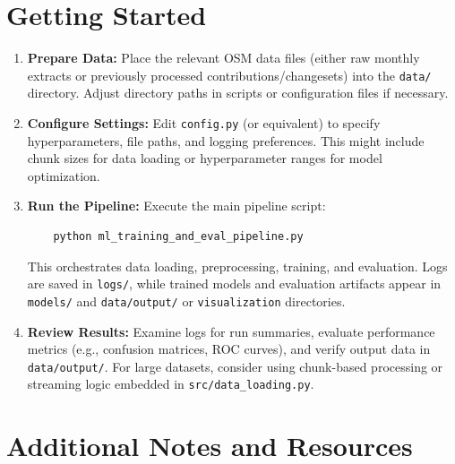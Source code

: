 \documentclass[
    13pt, %
    a4paper, %
    listof=totoc, %
    bibliography=totoc, %
    index=totoc, %
    headsepline
]{scrreprt}
\begin{document}
\section{Getting Started}
\label{sec:getting_started}

\begin{enumerate}
    \item \textbf{Prepare Data:} 
    Place the relevant OSM data files (either raw monthly extracts or previously processed contributions/changesets) into the \texttt{data/} directory. Adjust directory paths in scripts or configuration files if necessary.

    \item \textbf{Configure Settings:}
    Edit \texttt{config.py} (or equivalent) to specify hyperparameters, file paths, and logging preferences. This might include chunk sizes for data loading or hyperparameter ranges for model optimization.

    \item \textbf{Run the Pipeline:} 
    Execute the main pipeline script:
    \begin{verbatim}
    python ml_training_and_eval_pipeline.py
    \end{verbatim}
    This orchestrates data loading, preprocessing, training, and evaluation. Logs are saved in \texttt{logs/}, while trained models and evaluation artifacts appear in \texttt{models/} and \texttt{data/output/} or \texttt{visualization} directories.

    \item \textbf{Review Results:} 
    Examine logs for run summaries, evaluate performance metrics (e.g., confusion matrices, ROC curves), and verify output data in \texttt{data/output/}. For large datasets, consider using chunk-based processing or streaming logic embedded in \texttt{src/data\_loading.py}.
\end{enumerate}

\section{Additional Notes and Resources}
\label{sec:extra_notes}
\end{document}
